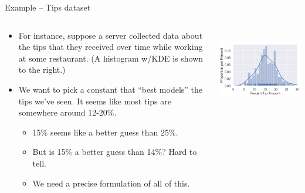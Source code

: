 \documentclass[aspectratio=169]{../latex_main/tntbeamer}  %
\begin{document}
	
	
	\begin{frame}{Example – Tips dataset}
	\begin{columns}
	  \begin{column}{.6\textwidth}
	    \begin{itemize}
	        \item For instance, suppose a server collected data about the tips that they received over time while working at some restaurant. (A histogram w/KDE is shown to the right.)
	        \item We want to pick a constant that “best models” the tips we’ve seen. It seems like most tips are somewhere around 12-20\%.
	        \begin{itemize}
	            \item 15\% seems like a better guess than 25\%.
	            \item But is 15\% a better guess than 14\%? Hard to tell. 
	            \item We need a precise formulation of all of this.
	        \end{itemize}
	    \end{itemize}
	  \end{column}
	  
	  
	  \begin{column}{.4\textwidth}
	          \\
	          \vspace{1cm}
	          \includegraphics[scale=.5]{Bild18}
	  \end{column}
	\end{columns}
	\end{frame}
	
\end{document}
